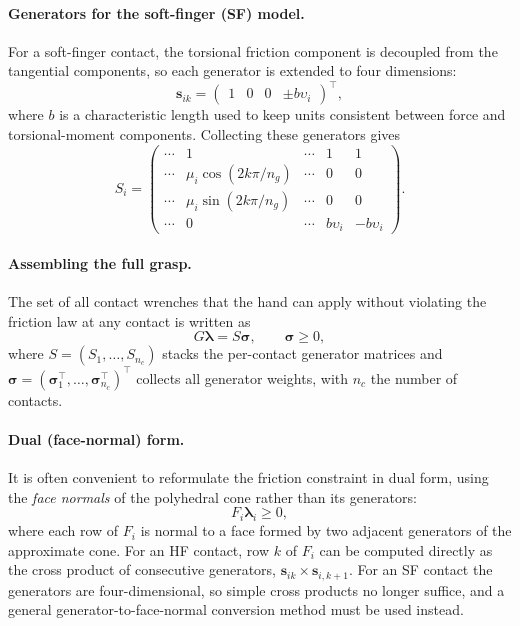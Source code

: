 \paragraph{Generators for the soft-finger (SF) model.}
For a soft-finger contact, the torsional friction component is decoupled
from the tangential components, so each generator is extended to four
dimensions:
\begin{equation}
    \mathbf{s}_{ik} = \begin{pmatrix} 1 & 0 & 0 & \pm b \upsilon_i \end{pmatrix}^\top ,
\end{equation}
where $b$ is a characteristic length used to keep units consistent between
force and torsional-moment components. Collecting these generators gives
\begin{equation}
    S_i =
    \begin{pmatrix}
        \cdots & 1 & \cdots & 1 & 1 \\
        \cdots & \mu_i \cos(2k\pi/n_g) & \cdots & 0 & 0 \\
        \cdots & \mu_i \sin(2k\pi/n_g) & \cdots & 0 & 0 \\
        \cdots & 0 & \cdots & b\upsilon_i & -b\upsilon_i
    \end{pmatrix}.
    \label{eq:Si-SF}
\end{equation}

\paragraph{Assembling the full grasp.}
The set of all contact wrenches that the hand can apply without violating
the friction law at any contact is written as
\begin{equation}
    G \boldsymbol{\lambda} = S \boldsymbol{\sigma}, \qquad \boldsymbol{\sigma} \ge 0 ,
\end{equation}
where $S = (S_1, \dots, S_{n_c})$ stacks the per-contact generator matrices
and $\boldsymbol{\sigma} = (\boldsymbol{\sigma}_1^\top, \dots,
\boldsymbol{\sigma}_{n_c}^\top)^\top$ collects all generator weights, with
$n_c$ the number of contacts.

\paragraph{Dual (face-normal) form.}
It is often convenient to reformulate the friction constraint in dual form,
using the \emph{face normals} of the polyhedral cone rather than its
generators:
\begin{equation}
    F_i \boldsymbol{\lambda}_i \ge 0 ,
    \label{eq:face-normal-form}
\end{equation}
where each row of $F_i$ is normal to a face formed by two adjacent generators
of the approximate cone. For an HF contact, row $k$ of $F_i$ can be computed
directly as the cross product of consecutive generators,
$\mathbf{s}_{ik} \times \mathbf{s}_{i,k+1}$. For an SF contact the generators
are four-dimensional, so simple cross products no longer suffice, and a
general generator-to-face-normal conversion method must be used instead.

